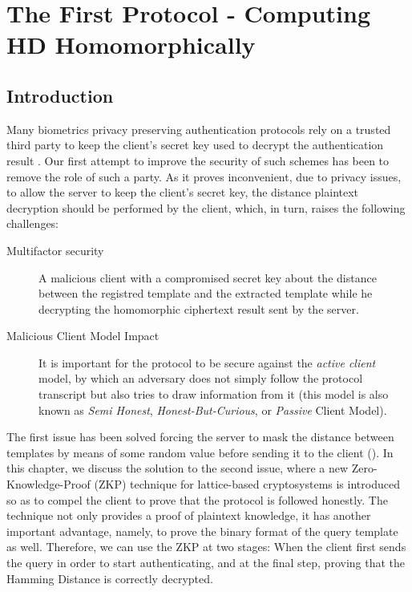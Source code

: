 \chapter{The First Protocol - Computing HD Homomorphically}
\label{chap:firstProtocol}

\ifpdf
    \graphicspath{{Chapter3/Figs/Raster/}{Chapter3/Figs/PDF/}{Chapter3/Figs/}}
\else
    \graphicspath{{Chapter3/Figs/Vector/}{Chapter3/Figs/}}
\fi

\section{Introduction}
\label{sec:firstProcIntro}
Many biometrics privacy preserving authentication protocols rely on a trusted
third party to keep the client's secret key used to decrypt the authentication result
\missref{}. Our first attempt to improve the security of such schemes has been to
remove the role of such a party. As it proves inconvenient, due to privacy issues, to allow the server to keep the client's secret key, the distance plaintext decryption should be performed by the client, which, in turn, raises the following challenges:
\begin{description}
\item[Multifactor security] A malicious client with a compromised secret key
  about the distance between the registred template and the extracted template while he decrypting the homomorphic ciphertext result sent by the server.
\item[Malicious Client Model Impact] It is important for the protocol to be secure
  against the \textit{active client }model, by which an adversary does not simply follow the
  protocol transcript but also tries to draw information from it (this model is also known
  as \textit{Semi Honest}, \textit{Honest-But-Curious}, or \textit{Passive} Client Model). 
\end{description}

The first issue has been solved forcing the server to mask the distance between templates by means of some
random value before sending it to the client
(\cite{mandal2015comprehensive}). In this chapter, we discuss the solution to
the second issue, where a new Zero-Knowledge-Proof (ZKP) technique for
lattice-based cryptosystems is introduced so as to compel the client to prove that the protocol is followed honestly. The technique not only provides a
proof of plaintext knowledge, it has another important advantage, namely, to prove the
binary format of the query template as well. Therefore, we can use the ZKP at
two stages: When the client first sends the query in order to start authenticating,
and at the final step, proving that the Hamming Distance is correctly decrypted.


